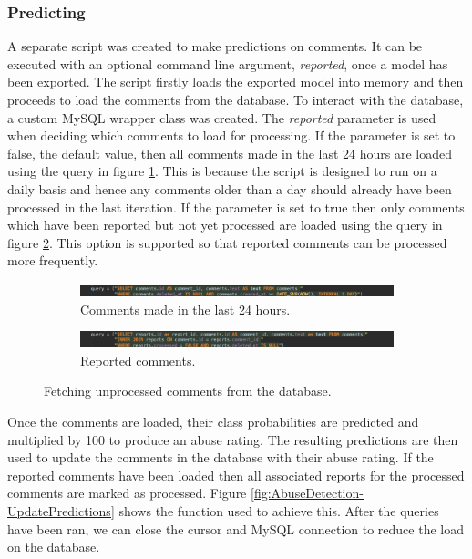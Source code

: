 \subsubsection{Predicting}
A separate script was created to make predictions on comments. It can be executed with an optional command line argument, \textit{reported}, once a model has been exported. The script firstly loads the exported model into memory and then proceeds to load the comments from the database. To interact with the database, a custom MySQL wrapper class was created. The \textit{reported} parameter is used when deciding which comments to load for processing. If the parameter is set to false, the default value, then all comments made in the last 24 hours are loaded using the query in figure \ref{fig:AbuseDetection-DailyComments}. This is because the script is designed to run on a daily basis and hence any comments older than a day should already have been processed in the last iteration. If the parameter is set to true then only comments which have been reported but not yet processed are loaded using the query in figure \ref{fig:AbuseDetection-ReportedComments}. This option is supported so that reported comments can be processed more frequently.
\begin{figure}[H]
	\centering
	\begin{subfigure}[t]{\linewidth}
		\centering
		\includegraphics[width=\linewidth]{Images/Implementation/DataProcessing/AbuseDetection/DailyCommentsQuery}
		\caption{Comments made in the last 24 hours.}\label{fig:AbuseDetection-DailyComments}		
	\end{subfigure}
	\quad
	\begin{subfigure}[t]{\linewidth}
		\centering
		\includegraphics[width=\linewidth]{Images/Implementation/DataProcessing/AbuseDetection/ReportedCommentsQuery}
		\caption{Reported comments.}\label{fig:AbuseDetection-ReportedComments}
	\end{subfigure}
	\caption{Fetching unprocessed comments from the database.}\label{fig:AbuseDetection-LoadingComments}
\end{figure}

Once the comments are loaded, their class probabilities are predicted and multiplied by 100 to produce an abuse rating. The resulting predictions are then used to update the comments in the database with their abuse rating. If the reported comments have been loaded then all associated reports for the processed comments are marked as processed. Figure \ref{fig:AbuseDetection-UpdatePredictions} shows the function used to achieve this. After the queries have been ran, we can close the cursor and MySQL connection to reduce the load on the database.

